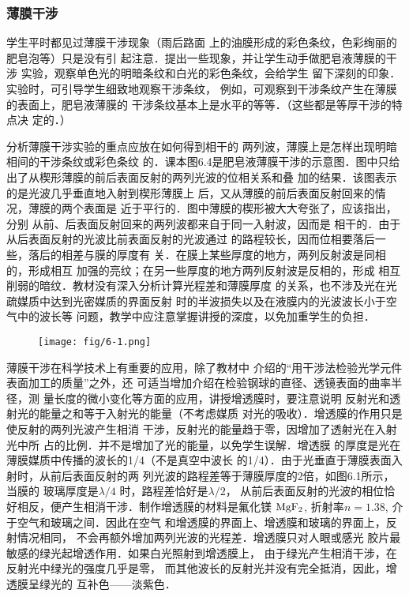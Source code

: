 \subsubsection{薄膜干涉 }
学生平时都见过薄膜干涉现象（雨后路面
上的油膜形成的彩色条纹，色彩绚丽的肥皂泡等）只是没有引
起注意．提出一些现象，并让学生动手做肥皂液薄膜的干涉
实验，观察单色光的明暗条纹和白光的彩色条纹，会给学生
留下深刻的印象．实验时，可引导学生细致地观察干涉条纹，
例如，可观察到干涉条纹产生在薄膜的表面上，肥皂液薄膜的
干涉条纹基本上是水平的等等．（这些都是等厚干涉的特点决
定的．）

分析薄膜干涉实验的重点应放在如何得到相干的
两列波，薄膜上是怎样出现明暗相间的干涉条纹或彩色条纹
的．课本图6.4是肥皂液薄膜干涉的示意图．图中只给
出了从楔形薄膜的前后表面反射的两列光波的位相关系和叠
加的结果．该图表示的是光波几乎垂直地入射到楔形薄膜上
后，又从薄膜的前后表面反射回来的情况，薄膜的两个表面是
近于平行的．图中薄膜的楔形被大大夸张了，应该指出，分别
从前、后表面反射回来的两列波都来自于同一入射波，因而是
相干的．由于从后表面反射的光波比前表面反射的光波通过
的路程较长，因而位相要落后一些，落后的相差与膜的厚度有
关．在膜上某些厚度的地方，两列反射波是同相的，形成相互
加强的亮纹；在另一些厚度的地方两列反射波是反相的，形成
相互削弱的暗纹．教材没有深入分析计算光程差和薄膜厚度
的关系，也不涉及光在光疏媒质中达到光密媒质的界面反射
时的半波损失以及在液膜内的光波波长小于空气中的波长等
问题，教学中应注意掌握讲授的深度，以免加重学生的负担．

\begin{figure}[htp]
    \centering
    \texttt{[image: fig/6-1.png]}
    \caption{}
\end{figure}


薄膜干涉在科学技术上有重要的应用，除了教材中
介绍的“用干涉法检验光学元件表面加工的质量”之外，还
可适当增加介绍在检验钢球的直径、透镜表面的曲率半径，测
量长度的微小变化等方面的应用，讲授增透膜时，要注意说明
反射光和透射光的能量之和等于入射光的能量（不考虑媒质
对光的吸收）．增透膜的作用只是使反射的两列光波产生相消
干涉，反射光的能量趋于零，因增加了透射光在入射光中所
占的比例．并不是增加了光的能量，以免学生误解．增透膜
的厚度是光在薄膜媒质中传播的波长的1/4（不是真空中波长
的1/4）．由于光垂直于薄膜表面入射时，从前后表面反射的两
列光波的路程差等于薄膜厚度的2倍，如图6.1所示，当膜的
玻璃厚度是$\lambda/4$
时，路程差恰好是$\lambda/2$，
从前后表面反射的光波的相位恰好相反，便产生相消干涉．制作增透膜的材料是氟化镁
${\rm MgF_2}$, 折射率$n=1.38$, 介于空气和玻璃之间．因此在空气
和增透膜的界面上、增透膜和玻璃的界面上，反射情况相同，
不会再额外增加两列光波的光程差．增透膜只对人眼或感光
胶片最敏感的绿光起增透作用．如果白光照射到增透膜上，
由于绿光产生相消干涉，在反射光中绿光的强度几乎是零，
而其他波长的反射光并没有完全抵消，因此，增透膜呈绿光的
互补色——淡紫色．

